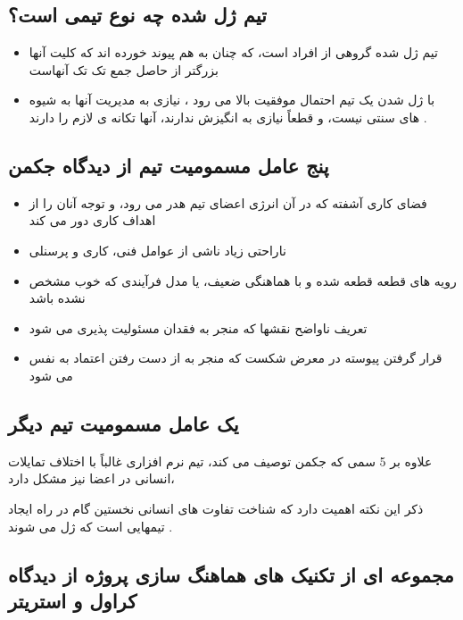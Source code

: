 \documentclass{article}
\begin{document}
\subsection{تیم ژل شده چه نوع تیمی است؟}

\begin{itemize}
	\item تیم ژل شده گروهی از افراد است، که چنان به هم پیوند خورده اند که کلیت آنها بزرگتر از حاصل جمع تک تک آنهاست 
	\item با ژل شدن یک تیم احتمال موفقیت بالا می رود ، نیازی به مدیریت آنها به شیوه های سنتی نیست، و قطعاً نیازی به انگیزش ندارند، آنها تکانه ی لازم را دارند .
\end{itemize}





\subsection{پنج عامل مسمومیت تیم از دیدگاه جکمن}


\begin{itemize}
	\item فضای کاری آشفته که  در آن انرژی اعضای تیم هدر می رود، و توجه آنان را از اهداف کاری دور می کند
	\item ناراحتی زیاد ناشی از عوامل فنی، کاری و پرسنلی
	\item رویه های قطعه قطعه شده و با هماهنگی ضعیف، یا مدل فرآیندی که خوب مشخص نشده باشد
	\item تعریف ناواضح نقشها که منجر به فقدان مسئولیت پذیری می شود
	\item قرار گرفتن پیوسته در معرض شکست که منجر به از دست رفتن اعتماد به نفس می شود
\end{itemize}



\subsection{یک عامل مسمومیت تیم دیگر}
علاوه بر 5 سمی که جکمن توصیف می کند، تیم نرم افزاری غالباً با اختلاف تمایلات انسانی در اعضا نیز مشکل دارد، 

ذکر این نکته اهمیت دارد که شناخت تفاوت های انسانی نخستین گام در راه ایجاد تیمهایی است که ژل می شوند .




\newpage


\subsection{مجموعه ای از تکنیک های هماهنگ سازی پروژه از دیدگاه کراول و استریتر}
\end{document}
